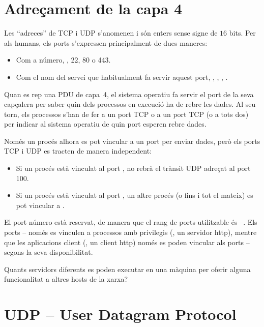 \section{Adreçament de la capa 4}\label{sec:layer4:addressing}

Les ``adreces'' de TCP i UDP s'anomenen  i són enters sense signe de $16$ bits.
Per als humans, els ports s'expressen principalment de dues maneres:
\begin{itemize}
\item Com a número, \eg, 22, 80 o 443.
\item Com el nom del servei que habitualment fa servir aquest port, \eg, , , .
\end{itemize}

Quan es rep una PDU de capa~4, el sistema operatiu fa servir el port de la seva capçalera per saber quin dels
processos en execució ha de rebre les dades.
Al seu torn, els processos s'han de fer  a un port TCP o a un port TCP (o a tots dos)
per indicar al sistema operatiu de quin port esperen rebre dades.

Només un procés alhora es pot vincular a un port per enviar dades, però els ports TCP i UDP
es tracten de manera independent:
\begin{itemize}
 \item Si un procés està vinculat al port , no rebrà el trànsit UDP adreçat al port 100.
 \item Si un procés està vinculat al port , un altre procés (o fins i tot el mateix) es pot
   vincular a .  
\end{itemize}

El port número  està reservat, de manera que el rang de ports utilitzable és \mbox{--}.
Els ports -- només es vinculen a
processos amb privilegis (\eg, un servidor http), mentre que les aplicacions client (\eg, un client http)
només es poden vincular als ports -- segons la seva disponibilitat.

\begin{exercise}
Quants servidors diferents es poden executar en una màquina per oferir alguna funcionalitat a altres hosts de la xarxa?
\end{exercise}


\section{UDP -- User Datagram Protocol}\label{sec:layer4:udp}
